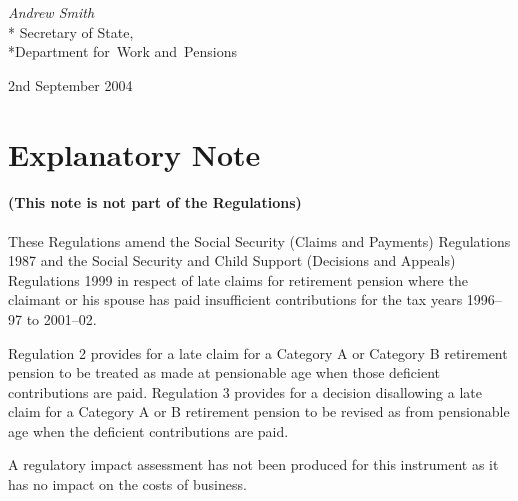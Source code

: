 \documentclass[12pt,a4paper]{article}
\begin{document}
\bigskip


{\raggedleft
\emph{Andrew Smith}\\*
Secretary
of State,\\*Department 
for~Work and~Pensions

}

2nd September 2004

\small

\part{Explanatory Note}

\renewcommand\parthead{— Explanatory Note}

\subsection*{(This note is not part of the Regulations)}

These Regulations amend the Social Security (Claims and Payments) Regulations 1987 and the Social Security and Child Support (Decisions and Appeals) Regulations 1999 in respect of late claims for retirement pension where the claimant or his spouse has paid insufficient contributions for the tax years 1996--97 to 2001--02.

Regulation 2 provides for a late claim for a Category A or Category B retirement pension to be treated as made at pensionable age when those deficient contributions are paid. Regulation 3 provides for a decision disallowing a late claim for a Category A or B retirement pension to be revised as from pensionable age when the deficient contributions are paid.

A regulatory impact assessment has not been produced for this instrument as it has no impact on the costs of business. 
\end{document}
